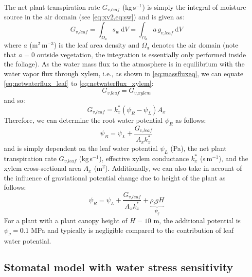 The net plant transpiration rate $G_{\textit{v,leaf}}$ (kg\,s$^{-1}$) is simply the integral of moisture source in the air domain (see \cref{eq:xv2,eq:sw}) and is given as:
\begin{equation}
G_{\textit{v,leaf}} = \int_{\Omega_a} s_w~\mathrm{d}V = \int_{\Omega_a} a\,g_{\textit{v,leaf}}~\mathrm{d}V
\label{eq:netwaterflux_leaf}
\end{equation}
where $a$ (m$^2$\,m$^{-3}$) is the leaf area density and $\Omega_a$ denotes the air domain (note that $a=0$ outside vegetation, the integration is essentially only performed inside the foliage). As the water mass flux to the atmosphere is in equilibrium with the water vapor flux through xylem, i.e., as shown in \cref{eq:massfluxeq}, we can equate \cref{eq:netwaterflux_leaf} to \cref{eq:netwaterflux_xylem}:
\begin{equation}
G_{\textit{v,leaf}} = G_{\textit{v,xylem}}
\end{equation}
and so:
\begin{equation}
G_{\textit{v,leaf}} = k_x^* \left( \psi_R - \psi_L \right) A_x
\end{equation}
Therefore, we can determine the root water potential $\psi_R$ as follows:
\begin{equation}
\psi_R = \psi_L  + \frac{G_{\textit{v,leaf}}}{A_x k_x^*}
\end{equation}
and is simply dependent on the leaf water potential $\psi_L$ (Pa), the net plant transpiration rate $G_{\textit{v,leaf}}$ (kg\,s$^{-1}$), effective xylem conductance $k_x^*$ (s\,m$^{-1}$), and the xylem cross-sectional area $A_x$ (m$^2$). Additionally, we can also take in account of the influence of graviational potential change due to height of the plant as follows:
\begin{equation}
\psi_R = \psi_L  + \frac{G_{\textit{v,leaf}}}{A_x k_x^*} + \underbrace{\rho_l g H}_{\psi_g}
\end{equation}
For a plant with a plant canopy height of $H = 10$ m, the additional potential is $\psi_g = 0.1$ MPa and typically is negligible compared to the contribution of leaf water potential.

\subsection{Stomatal model with water stress sensitivity}
\label{subsec:sm}
	
